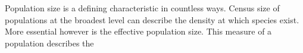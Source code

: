 Population size is a defining characteristic in countless ways.
 Census size of populations at the broadest level can describe the density
 at which species exist.
 More essential however is the effective population size.
 This measure of a population describes the
